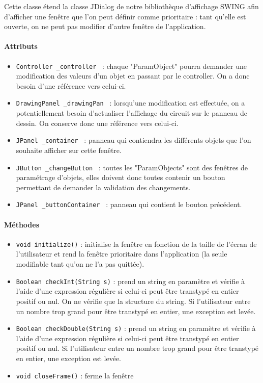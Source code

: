 \documentclass{report}
\begin{document}
Cette classe étend la classe JDialog de notre bibliothèque d'affichage SWING afin d'afficher une fenêtre que l'on peut définir comme prioritaire : tant qu'elle est ouverte, on ne peut pas modifier d'autre fenêtre de l'application. 

\paragraph*{Attributs}
\begin{itemize}
\item \texttt{Controller \_controller } : chaque "ParamObject" pourra demander une modification des valeurs d'un objet en passant par le controller. On a donc besoin d'une référence vers celui-ci.
\item \texttt{DrawingPanel \_drawingPan } : lorsqu'une modification est effectuée, on a potentiellement besoin d'actualiser l'affichage du circuit sur le panneau de dessin. On conserve donc une référence vers celui-ci.
\item \texttt{JPanel \_container } : panneau qui contiendra les différents objets que l'on souhaite afficher sur cette fenêtre.
\item \texttt{JButton \_changeButton } : toutes les "ParamObjects" sont des fenêtres de paramétrage d'objets, elles doivent donc toutes contenir un bouton permettant de demander la validation des changements.
\item \texttt{JPanel \_buttonContainer } : panneau qui contient le bouton précédent.
\end{itemize}

\paragraph*{Méthodes}
\begin{itemize}
\item \texttt{void initialize()} : initialise la fenêtre en fonction de la taille de l'écran de l'utilisateur et rend la fenêtre prioritaire dans l'application (la seule modifiable tant qu'on ne l'a pas quittée).
\item \texttt{Boolean checkInt(String s)} : prend un string en paramètre et vérifie à l'aide d'une expression régulière si celui-ci peut être transtypé en entier positif ou nul. On ne vérifie que la structure du string. Si l'utilisateur entre un nombre trop grand pour être transtypé en entier, une exception est levée.
\item \texttt{Boolean checkDouble(String s)} : prend un string en paramètre et vérifie à l'aide d'une expression régulière si celui-ci peut être transtypé en entier positif ou nul. Si l'utilisateur entre un nombre trop grand pour être transtypé en entier, une exception est levée.
\item \texttt{void closeFrame()} : ferme la fenêtre
\end{itemize}
\end{document}

